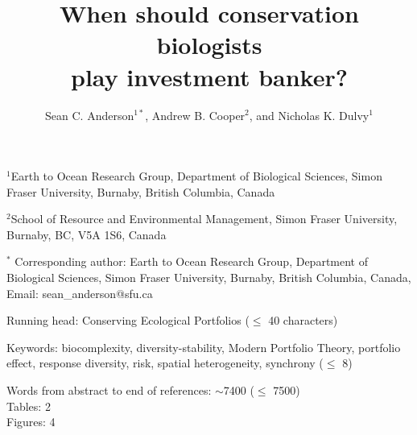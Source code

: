 \documentclass[12pt]{article}
\title{When should conservation biologists\\
       play investment banker?}
\author{Sean C. Anderson$^{1\ast}$,
  Andrew B. Cooper$^2$,
  and Nicholas K. Dulvy$^1$}
\date{}
\begin{document}
\maketitle
$^1$Earth to Ocean Research Group,
Department of Biological Sciences,
Simon Fraser University,
Burnaby, British Columbia, Canada

$^2$School of Resource and Environmental Management,
Simon Fraser University,
Burnaby, BC, V5A 1S6, Canada

$^{\ast}$
Corresponding author:
Earth to Ocean Research Group,
Department of Biological Sciences,
Simon Fraser University,
Burnaby, British Columbia, Canada,
Email: sean\_anderson@sfu.ca

Running head: Conserving Ecological Portfolios ($\le$ 40 characters)

Keywords:
biocomplexity,
diversity-stability,
Modern Portfolio Theory,
portfolio effect,
response diversity,
risk,
spatial heterogeneity,
synchrony
($\le$ 8)

Words from abstract to end of references: $\sim$7400 ($\le$ 7500)\\
Tables: 2\\
Figures: 4\\

\clearpage
\linenumbers
\begin{spacing}{1.6}

\end{spacing}
\end{document}
